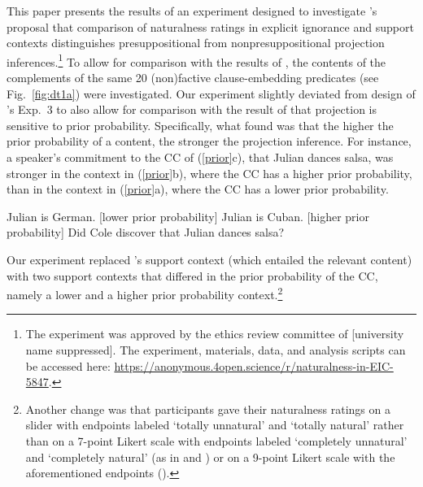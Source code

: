 \documentclass[11pt,fleqn]{article}
\newcommand{\6}{\mbox{$[\hspace*{-.6mm}[$}}
\newcommand{\9}{\mbox{$]\hspace*{-.6mm}]$}}
\newcommand{\citepos}[1]{\citeauthor{#1}'s \citeyear{#1}}
\begin{document}
This paper presents the results of an experiment designed to investigate \citepos{mandelkern-etal2020} proposal that comparison of naturalness ratings in explicit ignorance and support contexts distinguishes presuppositional from nonpresuppositional projection inferences.\footnote{\label{f:github}The experiment was approved by the ethics review committee of [university name suppressed]. The experiment, materials, data, and analysis scripts can be accessed here:  \url{https://anonymous.4open.science/r/naturalness-in-EIC-5847}.}  To allow for comparison with the results of \citealt{degen-tonhauser-language}, the contents of the complements of the same 20 (non)factive clause-embedding predicates (see Fig.~\ref{fig:dt1a}) were investigated. Our experiment slightly deviated from design of \citepos{mandelkern-etal2020} Exp.~3  to also allow for comparison with the result of \citealt{degen-tonhauser-openmind} that projection is sensitive to prior probability. Specifically, what \citealt{degen-tonhauser-openmind} found was that the higher the prior probability of a content, the stronger the projection inference. For instance, a speaker's commitment to the CC of (\ref{prior}c), that Julian dances salsa, was stronger in the context in (\ref{prior}b), where the CC has a higher prior probability, than in the context in (\ref{prior}a), where the CC has a lower prior probability.

\begin{exe}
\ex\label{prior}
\begin{xlist}
\ex Julian is German. \hfill [lower prior probability]
\ex Julian is Cuban. \hfill [higher prior probability]
\ex Did Cole discover that Julian dances salsa?
\end{xlist}
\end{exe}
Our experiment replaced \citepos{mandelkern-etal2020} support context (which entailed the relevant content) with two support contexts that differed in the prior probability of the CC, namely a lower and a higher prior probability context.\footnote{Another change was that participants gave their naturalness ratings on a slider with endpoints labeled `totally unnatural' and `totally natural' rather than on a 7-point Likert scale with endpoints labeled `completely unnatural' and `completely natural' (as in \citealt[Exp.3]{mandelkern-etal2020} and \citealt[Exp.~1]{kalomoiros-schwarz2024}) or on a 9-point Likert scale with the aforementioned endpoints (\citealt[Exp.~2]{kalomoiros-schwarz2024}).} %
\end{document}
